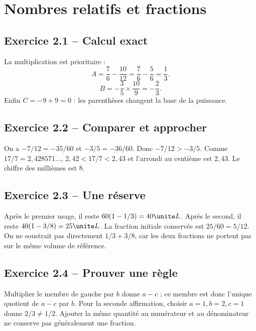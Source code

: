 \chapter{Nombres relatifs et fractions}
\label{corriges:02}
\section*{Exercice 2.1 -- Calcul exact}
La multiplication est prioritaire :
\[A=\frac76-\frac{10}{12}=\frac76-\frac56=\frac13.\]
\[B=-\frac35\times\frac{10}{9}=-\frac23.\]
Enfin $C=-9+9=0$ : les parenthèses changent la base de la puissance.

\section*{Exercice 2.2 -- Comparer et approcher}
On a $-7/12=-35/60$ et $-3/5=-36/60$. Donc $-7/12>-3/5$.
Comme $17/7=2{,}428571\ldots$, $2{,}42<17/7<2{,}43$ et l'arrondi au centième est $2{,}43$. Le chiffre des millièmes est $8$.

\section*{Exercice 2.3 -- Une réserve}
Après le premier usage, il reste $60(1-1/3)=40\unite L$. Après le second, il reste $40(1-3/8)=25\unite L$. La fraction initiale conservée est $25/60=5/12$. On ne soustrait pas directement $1/3+3/8$, car les deux fractions ne portent pas sur le même volume de référence.

\section*{Exercice 2.4 -- Prouver une règle}
Multiplier le membre de gauche par $b$ donne $a-c$ ; ce membre est donc l'unique quotient de $a-c$ par $b$. Pour la seconde affirmation, choisir $a=1,b=2,c=1$ donne $2/3\ne1/2$. Ajouter la même quantité au numérateur et au dénominateur ne conserve pas généralement une fraction.
